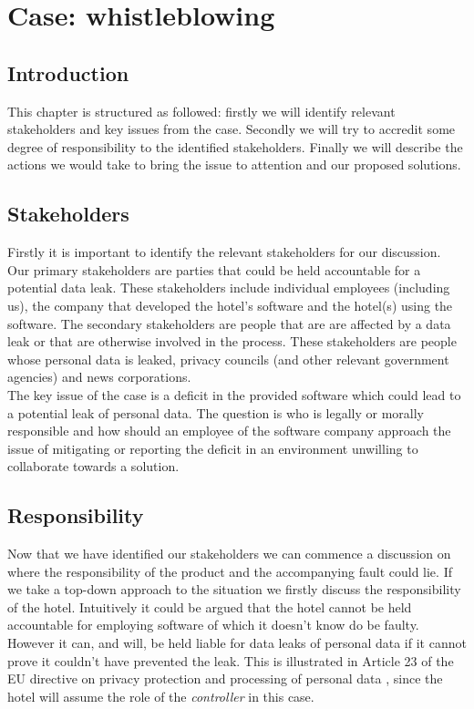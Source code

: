 \chapter{Case: whistleblowing}\label{ch:whistleblowing}
\section{Introduction}
This chapter is structured as followed: firstly we will identify relevant stakeholders and key issues from the case. Secondly we will try to accredit some degree of responsibility to the identified stakeholders. Finally we will describe the actions we would take to bring the issue to attention and our proposed solutions.

\section{Stakeholders}
Firstly it is important to identify the relevant stakeholders for our discussion. Our primary stakeholders are parties that could be held accountable for a potential data leak. These stakeholders include individual employees (including us), the company that developed the hotel's software and the hotel(s) using the software.  The secondary stakeholders are people that are are affected by a data leak or that are otherwise involved in the process. These stakeholders are people whose personal data is leaked, privacy councils (and other relevant government agencies) and news corporations.\\
The key issue of the case is a deficit in the provided software which could lead to a potential leak of personal data. The question is who is legally or morally responsible and how should an employee of the software company approach the issue of mitigating or reporting the deficit in an environment unwilling to collaborate towards a solution.

\section{Responsibility}
Now that we have identified our stakeholders we can commence a discussion on where the responsibility of the product and the accompanying fault could lie. If we take a top-down approach to the situation we firstly discuss the responsibility of the hotel. Intuitively it could be argued that the hotel cannot be held accountable for employing software of which it doesn't know do be faulty. However it can, and will, be held liable for data leaks of personal data if it cannot prove it couldn't have prevented the leak. This is illustrated in Article 23 of the EU directive on privacy protection and processing of personal data \cite{privacy_directive}, since the hotel will assume the role of the \textit{controller} in this case.

